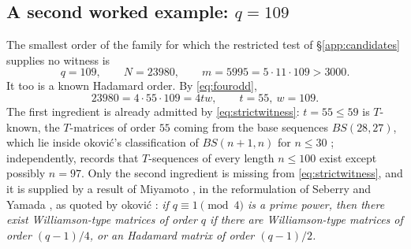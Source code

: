 \documentclass[11pt]{article}
\begin{document}
\subsection{A second worked example: \texorpdfstring{\(q=109\)}{q=109}}
\label{app:109}

The smallest order of the family for which the restricted test of
\S\ref{app:candidates} supplies no witness is
\[
        q=109,\qquad N=23980,\qquad m=5995=5\cdot11\cdot109>3000 .
\]
It too is a known Hadamard order.  By \eqref{eq:fourodd},
\[
        23980 = 4\cdot 55\cdot 109 = 4tw,\qquad t=55,\ w=109 .
\]
The first ingredient is already admitted by \eqref{eq:strictwitness}:
\(t=55\le59\) is \(T\)-known, the \(T\)-matrices of order \(55\) coming
from the base sequences \(BS(28,27)\), which lie inside \DJ okovi\'c's
classification of \(BS(n+1,n)\) for \(n\le30\) \cite{Djokovic2010BS};
independently, \cite[\S2]{Djokovic2011} records that \(T\)-sequences of
every length \(n\le100\) exist except possibly \(n=97\).  Only the
second ingredient is missing from \eqref{eq:strictwitness}, and it is
supplied by a result of Miyamoto \cite{Miyamoto1991}, in the
reformulation of Seberry and Yamada
\cite[Cor.~8.8, part~1]{SeberryYamada1992}, as quoted by
\DJ okovi\'c \cite[Thm.~2.5]{Djokovic2011}:
\emph{if \(q\equiv1\pmod4\) is a prime power, then there exist
Williamson-type matrices of order \(q\) if there are Williamson-type
matrices of order \((q-1)/4\), or an Hadamard matrix of order
\((q-1)/2\).}
\end{document}
